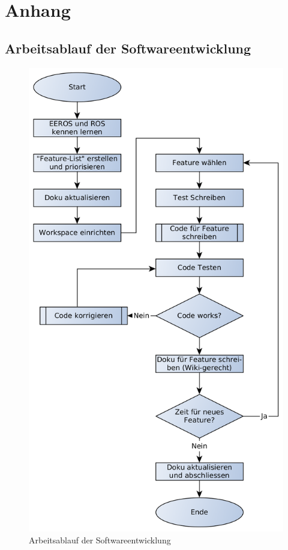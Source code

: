 \chapter{Anhang}

\section{Arbeitsablauf der Softwareentwicklung}
\label{anhangAblaufSoftwareentwicklung}

\begin{figure}[!ht]
\centering
\includegraphics[angle=0,height=0.8\textheight]{images/ablaufSoftwareentwicklung.png}
\caption{Arbeitsablauf der Softwareentwicklung}
\label{fig:arbeitsablaufSoftwareentwicklung}
\end{figure}

